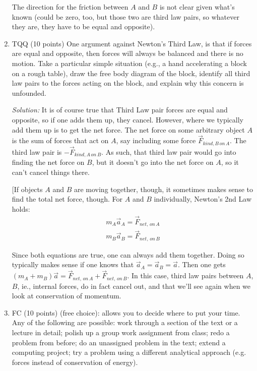 \documentclass[12pt]{article}
\newcommand{\soln}[1] {\textit{Solution:} #1}
\begin{document}
\begin{enumerate}
The direction for the friction between $A$ and $B$ is not clear given what's known (could be zero, too, but those two are third law pairs, so whatever they are, they have to be equal and opposite).

\item	TQQ (10 points) One argument against Newton’s Third Law, is that if forces are equal and opposite, then forces will always be balanced and there is no motion.  Take a particular simple situation (e.g., a hand accelerating a block on a rough table), draw the free body diagram of the block, identify all third law pairs to the forces acting on the block, and explain why this concern is unfounded.

\soln{It is of course true that Third Law pair forces are equal and opposite, so if one adds them up, they cancel. However, where we typically add them up is to get the net force. The net force on some arbitrary object $A$ is the sum of forces that act on $A$, say including some force $\vec F_{kind, B\,on\,A}$. The third law pair is $-\vec F_{kind, A\,on\,B}$. As such, that third law pair would go into finding the net force on $B$, but it doesn't go into the net force on $A$, so it can't cancel things there.

[If objects $A$ and $B$ are moving together, though, it sometimes makes sense to find the total net force, though. For $A$ and $B$ individually, Newton's 2nd Law holds:
\begin{align}
  m_A \vec a_A = \vec F_{net, \,on\, A}\\
  m_B \vec a_B = \vec F_{net, \,on\, B}
\end{align}

Since both equations are true, one can always add them together. Doing so typically makes sense if one knows that $\vec a_A = \vec a_B = \vec a$. Then one gets $(m_A + m_B) \vec a = \vec F_{net, \,on\, A} + \vec F_{net, \,on\, B}$. In this case, third law pairs between $A$, $B$, ie., internal forces, do in fact cancel out, and that we'll see again when we look at conservation of momentum.


}

\item	FC (10 points) (free choice): allows you to decide where to put your time.  Any of the following are possible: work through a section of the text or a lecture in detail; polish up a group work assignment from class; redo a problem from before; do an unassigned problem in the text; extend a computing project; try a problem using a different analytical approach (e.g. forces instead of conservation of energy).

\end{enumerate}
\end{document}
